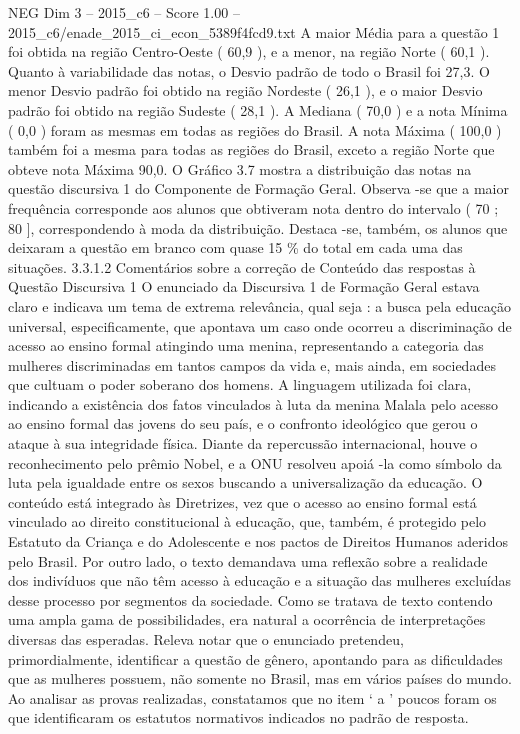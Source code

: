 \begin{textsample}{NEG Dim 3 – 2015\_c6 – Score 1.00 – 2015\_c6/enade\_2015\_ci\_econ\_5389f4fcd9.txt}
A maior Média para a questão 1 foi obtida na região Centro-Oeste ( 60,9 ), e a menor, na região Norte ( 60,1 ).
Quanto à variabilidade das notas, o Desvio padrão de todo o Brasil foi 27,3.
O menor Desvio padrão foi obtido na região Nordeste ( 26,1 ), e o maior Desvio padrão foi obtido na região Sudeste ( 28,1 ).
A Mediana ( 70,0 ) e a nota Mínima ( 0,0 ) foram as mesmas em todas as regiões do Brasil.
A nota Máxima ( 100,0 ) também foi a mesma para todas as regiões do Brasil, exceto a região Norte que obteve nota Máxima 90,0.
O Gráfico 3.7 mostra a distribuição das notas na questão discursiva 1 do Componente de Formação Geral.
Observa -se que a maior frequência corresponde aos alunos que obtiveram nota dentro do intervalo ( 70 ; 80 ], correspondendo à moda da distribuição.
Destaca -se, também, os alunos que deixaram a questão em branco com quase 15 \% do total em cada uma das situações. 3.3.1.2 Comentários sobre a correção de Conteúdo das respostas à Questão Discursiva 1 O enunciado da Discursiva 1 de Formação Geral estava claro e indicava um tema de extrema relevância, qual seja : a busca pela educação universal, especificamente, que apontava um caso onde ocorreu a discriminação de acesso ao ensino formal atingindo uma menina, representando a categoria das mulheres discriminadas em tantos campos da vida e, mais ainda, em sociedades que cultuam o poder soberano dos homens.
A linguagem utilizada foi clara, indicando a existência dos fatos vinculados à luta da menina Malala pelo acesso ao ensino formal das jovens do seu país, e o confronto ideológico que gerou o ataque à sua integridade física.
Diante da repercussão internacional, houve o reconhecimento pelo prêmio Nobel, e a ONU resolveu apoiá -la como símbolo da luta pela igualdade entre os sexos buscando a universalização da educação.
O conteúdo está integrado às Diretrizes, vez que o acesso ao ensino formal está vinculado ao direito constitucional à educação, que, também, é protegido pelo Estatuto da Criança e do Adolescente e nos pactos de Direitos Humanos aderidos pelo Brasil.
Por outro lado, o texto demandava uma reflexão sobre a realidade dos indivíduos que não têm acesso à educação e a situação das mulheres excluídas desse processo por segmentos da sociedade.
Como se tratava de texto contendo uma ampla gama de possibilidades, era natural a ocorrência de interpretações diversas das esperadas.
Releva notar que o enunciado pretendeu, primordialmente, identificar a questão de gênero, apontando para as dificuldades que as mulheres possuem, não somente no Brasil, mas em vários países do mundo.
Ao analisar as provas realizadas, constatamos que no item ‘ a ’ poucos foram os que identificaram os estatutos normativos indicados no padrão de resposta.

\end{textsample}
